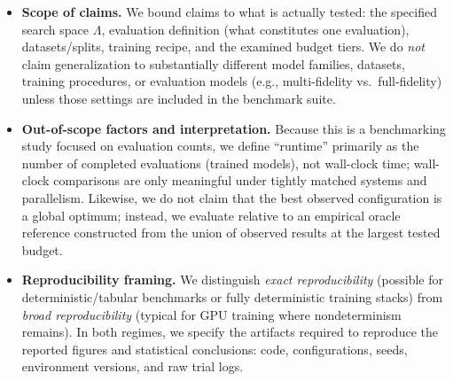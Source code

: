 \begin{itemize}
    \item \textbf{Scope of claims.}
    We bound claims to what is actually tested:
    the specified search space \(\Lambda\), evaluation definition (what constitutes one evaluation),
    datasets/splits, training recipe, and the examined budget tiers.
    We do \emph{not} claim generalization to substantially different model families, datasets, training procedures,
    or evaluation models (e.g., multi-fidelity vs.\ full-fidelity) unless those settings are included in the benchmark suite.

    \item \textbf{Out-of-scope factors and interpretation.}
    Because this is a benchmarking study focused on evaluation counts, we define ``runtime'' primarily as the number of completed evaluations
    (trained models), not wall-clock time; wall-clock comparisons are only meaningful under tightly matched systems and parallelism.
    Likewise, we do not claim that the best observed configuration is a global optimum; instead, we evaluate relative to an empirical oracle reference
    constructed from the union of observed results at the largest tested budget.

    \item \textbf{Reproducibility framing.}
    We distinguish \emph{exact reproducibility} (possible for deterministic/tabular benchmarks or fully deterministic training stacks)
    from \emph{broad reproducibility} (typical for GPU training where nondeterminism remains).
    In both regimes, we specify the artifacts required to reproduce the reported figures and statistical conclusions:
    code, configurations, seeds, environment versions, and raw trial logs.
\end{itemize}
